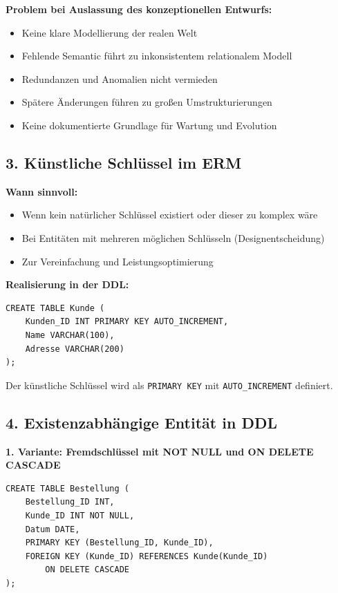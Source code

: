 \documentclass[12pt,a4paper]{article}
\begin{document}
\textbf{Problem bei Auslassung des konzeptionellen Entwurfs:}
\begin{itemize}
    \item Keine klare Modellierung der realen Welt
    \item Fehlende Semantic führt zu inkonsistentem relationalem Modell
    \item Redundanzen und Anomalien nicht vermieden
    \item Spätere Änderungen führen zu großen Umstrukturierungen
    \item Keine dokumentierte Grundlage für Wartung und Evolution
\end{itemize}

\subsection*{3. Künstliche Schlüssel im ERM}

\textbf{Wann sinnvoll:}
\begin{itemize}
    \item Wenn kein natürlicher Schlüssel existiert oder dieser zu komplex wäre
    \item Bei Entitäten mit mehreren möglichen Schlüsseln (Designentscheidung)
    \item Zur Vereinfachung und Leistungsoptimierung
\end{itemize}

\textbf{Realisierung in der DDL:}
\begin{verbatim}
CREATE TABLE Kunde (
    Kunden_ID INT PRIMARY KEY AUTO_INCREMENT,
    Name VARCHAR(100),
    Adresse VARCHAR(200)
);
\end{verbatim}

Der künstliche Schlüssel wird als \texttt{PRIMARY KEY} mit \texttt{AUTO\_INCREMENT} definiert.

\subsection*{4. Existenzabhängige Entität in DDL}

\textbf{1. Variante: Fremdschlüssel mit NOT NULL und ON DELETE CASCADE}
\begin{verbatim}
CREATE TABLE Bestellung (
    Bestellung_ID INT,
    Kunde_ID INT NOT NULL,
    Datum DATE,
    PRIMARY KEY (Bestellung_ID, Kunde_ID),
    FOREIGN KEY (Kunde_ID) REFERENCES Kunde(Kunde_ID)
        ON DELETE CASCADE
);
\end{verbatim}
\end{document}
